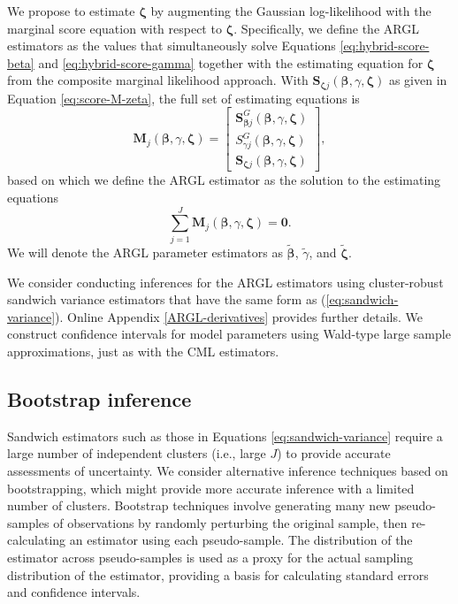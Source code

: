 \documentclass[
  american,
  man, donotrepeattitle,floatsintext]{apa7}
\begin{document}
We propose to estimate \(\boldsymbol\zeta\) by augmenting the Gaussian log-likelihood with the marginal score equation with respect to \(\boldsymbol\zeta\).
Specifically, we define the ARGL estimators as the values that simultaneously solve Equations \eqref{eq:hybrid-score-beta} and \eqref{eq:hybrid-score-gamma} together with the estimating equation for \(\boldsymbol\zeta\) from the composite marginal likelihood approach.
With \(\mathbf{S}_{\boldsymbol\zeta j}\left(\boldsymbol{\beta}, \gamma, \boldsymbol{\zeta}\right)\) as given in Equation \eqref{eq:score-M-zeta}, the full set of estimating equations is
\begin{equation}
\label{eq:hybrid-score}
\mathbf{M}_j(\boldsymbol\beta, \gamma, \boldsymbol\zeta) = \left[\begin{array}{c} \mathbf{S}^G_{\boldsymbol\beta j}(\boldsymbol\beta, \gamma, \boldsymbol\zeta) \\ S^G_{\gamma j}(\boldsymbol\beta, \gamma, \boldsymbol\zeta) \\ \mathbf{S}_{\boldsymbol\zeta j}(\boldsymbol\beta, \gamma, \boldsymbol\zeta) \end{array}\right],
\end{equation}
based on which we define the ARGL estimator as the solution to the estimating equations
\begin{equation}
\label{eq:hybrid-total-score}
\sum_{j=1}^J \mathbf{M}_j(\boldsymbol\beta, \gamma, \boldsymbol\zeta) = \mathbf{0}.
\end{equation}
We will denote the ARGL parameter estimators as \(\boldsymbol{\tilde\beta}\), \(\tilde\gamma\), and \(\boldsymbol{\tilde\zeta}\).

We consider conducting inferences for the ARGL estimators using cluster-robust sandwich variance estimators that have the same form as (\ref{eq:sandwich-variance}).
Online Appendix \ref{ARGL-derivatives} provides further details.
We construct confidence intervals for model parameters using Wald-type large sample approximations, just as with the CML estimators.

\subsection{Bootstrap inference}\label{bootstrap-inference}

Sandwich estimators such as those in Equations \eqref{eq:sandwich-variance} require a large number of independent clusters (i.e., large \(J\)) to provide accurate assessments of uncertainty.
We consider alternative inference techniques based on bootstrapping, which might provide more accurate inference with a limited number of clusters.
Bootstrap techniques involve generating many new pseudo-samples of observations by randomly perturbing the original sample, then re-calculating an estimator using each pseudo-sample.
The distribution of the estimator across pseudo-samples is used as a proxy for the actual sampling distribution of the estimator, providing a basis for calculating standard errors and confidence intervals.
\end{document}
